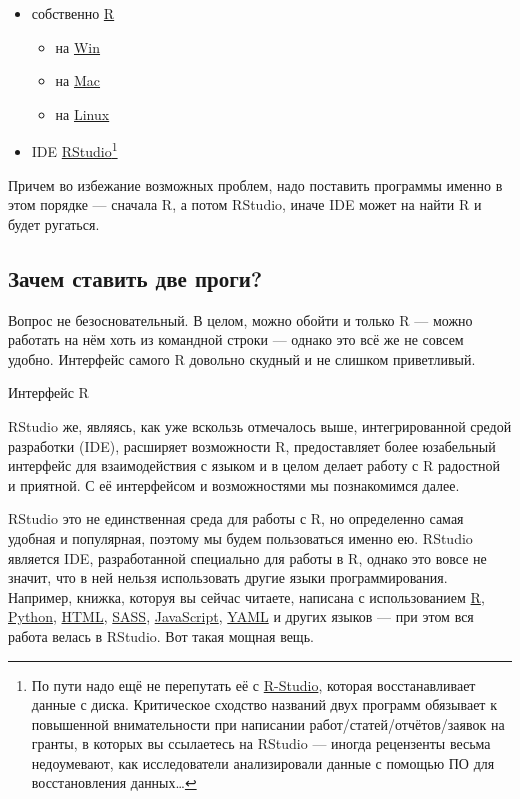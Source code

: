 \documentclass[
  letterpaper,
]{scrbook}
\providecommand{\tightlist}{%
  \setlength{\itemsep}{0pt}\setlength{\parskip}{0pt}}\usepackage{longtable,booktabs,array}
\theoremstyle{definition}
\theoremstyle{remark}
\begin{document}
\begin{itemize}
\tightlist
\item
  собственно \href{https://cran.r-project.org/}{R}

  \begin{itemize}
  \tightlist
  \item
    на \href{https://cran.r-project.org/bin/windows/base/}{Win}
  \item
    на \href{https://cran.r-project.org/bin/macosx/}{Mac}
  \item
    на \href{https://cran.rstudio.com/bin/linux/}{Linux}
  \end{itemize}
\item
  IDE
  \href{https://posit.co/download/rstudio-desktop/}{RStudio}\footnote{По
    пути надо ещё не перепутать её с
    \href{https://www.r-studio.com/ru/}{R-Studio}, которая
    восстанавливает данные с диска. Критическое сходство названий двух
    программ обязывает к повышенной внимательности при написании
    работ/статей/отчётов/заявок на гранты, в которых вы ссылаетесь на
    RStudio --- иногда рецензенты весьма недоумевают, как исследователи
    анализировали данные с помощью ПО для восстановления данных\ldots{}}
\end{itemize}

Причем во избежание возможных проблем, надо поставить программы именно в
этом порядке --- сначала R, а потом RStudio, иначе IDE может на найти R
и будет ругаться.

\subsection{Зачем ставить две проги?}\label{rbasics-why-we-need-both}

Вопрос не безосновательный. В целом, можно обойти и только R --- можно
работать на нём хоть из командной строки --- однако это всё же не совсем
удобно. Интерфейс самого R довольно скудный и не слишком приветливый.

Интерфейс R

RStudio же, являясь, как уже вскользь отмечалось выше, интегрированной
средой разработки (IDE), расширяет возможности R, предоставляет более
юзабельный интерфейс для взаимодействия с языком и в целом делает работу
с R радостной и приятной. С её интерфейсом и возможностями мы
познакомимся далее.

RStudio это не единственная среда для работы с R, но определенно самая
удобная и популярная, поэтому мы будем пользоваться именно ею. RStudio
является IDE, разработанной специально для работы в R, однако это вовсе
не значит, что в ней нельзя использовать другие языки программирования.
Например, книжка, которуя вы сейчас читаете, написана с использованием
\href{https://www.r-project.org/about.html}{R},
\href{https://www.python.org/}{Python},
\href{http://htmlbook.ru/html}{HTML},
\href{https://sass-lang.com/}{SASS},
\href{https://learn.javascript.ru/}{JavaScript},
\href{https://yaml.org/}{YAML} и других языков --- при этом вся работа
велась в RStudio. Вот такая мощная вещь.
\end{document}
